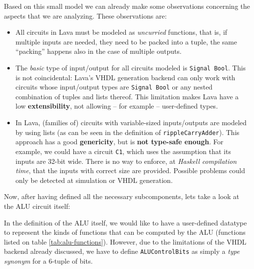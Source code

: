 \documentclass[a4paper]{article}
\begin{document}
                Based on this small model we can already make some observations concerning the
                aspects that we are analyzing. These observations are:
                \begin{itemize}
                    \item All circuits in Lava must be modeled as \emph{uncurried} functions, that
                        is, if multiple inputs are needed, they need to be packed into a tuple, the
                        same ``packing'' happens also in the case of multiple outputs.

                    \item The \emph{basic} type of input/output for all circuits modeled is
                        \texttt{Signal Bool}. This is not coincidental: Lava's VHDL generation
                        backend can only work with circuits whose input/output types are
                        \texttt{Signal Bool} or any nested combination of tuples and lists thereof.
                        This limitation makes Lava have a low \textbf{extensibility}, not allowing
                        -- for example -- user-defined types.

                    \item In Lava, (families of) circuits with variable-sized inputs/outputs are
                        modeled by using lists (as can be seen in the definition of
                        \texttt{rippleCarryAdder}). This approach has a good \textbf{genericity},
                        but is \textbf{not type-safe enough}. For example, we could have a circuit
                        \texttt{C1}, which uses the assumption that its inputs are 32-bit wide.
                        There is no way to enforce, at \emph{Haskell compilation time}, that the
                        inputs with correct size are provided.  Possible problems could only be
                        detected at simulation or VHDL generation.
                \end{itemize}

                Now, after having defined all the necessary subcomponents, lets take a look at the
                ALU circuit itself:
                

                In the definition of the ALU itself, we would like to have a user-defined datatype
                to represent the kinds of functions that can be computed by the ALU (functions
                listed on table \ref{tab:alu-functions}). However, due to the limitations of the
                VHDL backend already discussed, we have to define \texttt{ALUControlBits} as simply
                a \emph{type synonym} for a 6-tuple of bits.
\end{document}
